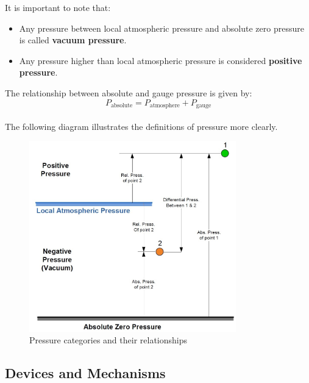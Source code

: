\documentclass{article}
\begin{document}
It is important to note that:\\[-5pt]
\begin{itemize}
	\item Any pressure between local atmospheric pressure and absolute zero pressure is called \textbf{vacuum pressure}.
	\item Any pressure higher than local atmospheric pressure is considered \textbf{positive pressure}.
\end{itemize}
\vspace{0.7em}\noindent
The relationship between absolute and gauge pressure is given by:\\[0.5em]
\begin{equation}
	P_{\text{absolute}} = P_{\text{atmosphere}} + P_{\text{gauge}}
	\label{eq:absolute}
\end{equation}\\
\vspace{0.5em}
The following diagram illustrates the definitions of pressure more clearly.	
\begin{figure}[H]
	\centering
	\includegraphics[width=0.8\textwidth]{images/Pressure Diagram.jpg}
	\caption{Pressure categories and their relationships}
	\label{fig:pressure_diagram}
\end{figure}


\newpage
\subsection{Devices and Mechanisms}
\end{document}
